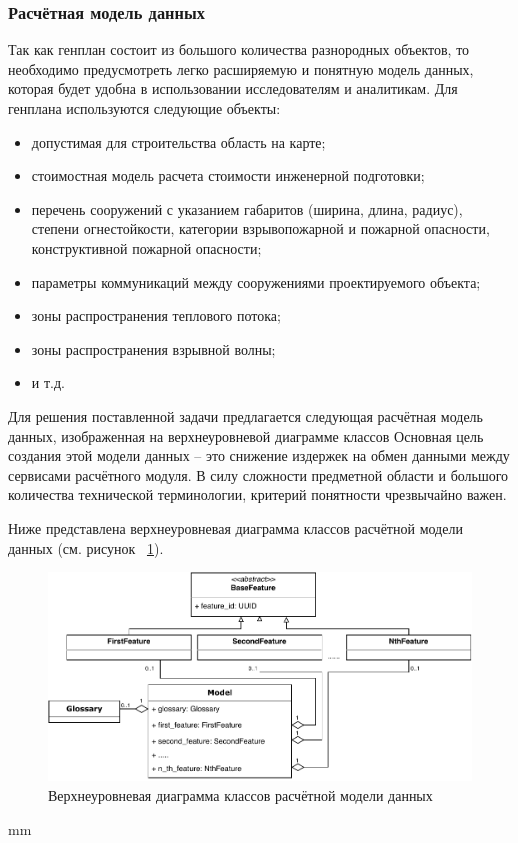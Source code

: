 \subsubsection{\large{Расчётная модель данных}}

Так как генплан состоит из большого количества разнородных объектов,
то необходимо предусмотреть легко расширяемую и понятную модель данных,
которая будет удобна в использовании исследователям и аналитикам.
Для генплана используются следующие объекты:
\begin{itemize}
    \item допустимая для строительства область на карте;
    \item стоимостная модель расчета стоимости инженерной подготовки;
    \item перечень сооружений с указанием габаритов (ширина, длина, радиус),
    степени огнестойкости, категории взрывопожарной и пожарной опасности, конструктивной пожарной опасности;
    \item параметры коммуникаций между сооружениями проектируемого объекта;
    \item зоны распространения теплового потока;
    \item зоны распространения взрывной волны;
	\item и т.д.
\end{itemize}

Для решения поставленной задачи предлагается следующая расчётная модель данных, изображенная
на верхнеуровневой диаграмме классов
Основная цель создания этой модели данных -- это снижение издержек на обмен данными между
сервисами расчётного модуля.
В силу сложности предметной области и большого количества технической терминологии,
критерий понятности чрезвычайно важен.

Ниже представлена верхнеуровневая диаграмма классов расчётной модели данных
(см. рисунок \ \ref{pic:architecture__model-classes}).

\begin{figure}[H]
	\includegraphics[width=\textwidth, left]{architecture/pictures/model/classes}
	\caption{Верхнеуровневая диаграмма классов расчётной модели данных}
	\label{pic:architecture__model-classes}
\end{figure}
 mm

